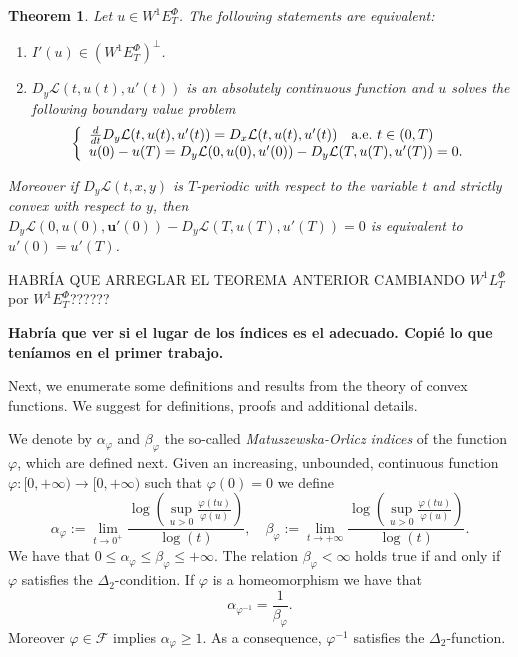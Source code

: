 \documentclass[twoside]{article}
\newtheorem{thm}{Theorem}[section]
\theoremstyle{remark}
\newcommand{\lphi}{L^{\Phi}}
\newcommand{\ephi}{E^{\Phi}}
\newcommand{\wphi}{W^{1}\lphi}
\newcommand{\wphiet}{W^{1}\ephi_T}
\renewcommand{\b}[1]{\boldsymbol{#1}}
\renewcommand{\leq}{\leqslant}
\renewcommand{\geq}{\geqslant}
\begin{document}
\begin{thm}\label{critpoint} Let $u\in\wphiet$. The following statements are equivalent:
\begin{enumerate}
 \item $I'(u)\in\left( \wphiet\right)^{\perp}$.
 \item  $D_{y}\mathcal{L}(t,u(t),u'(t))$ is an absolutely continuous function and $u$ solves the following boundary value problem
 \begin{equation}\label{ecualagran2}
    \left\{%
\begin{array}{ll}
   \frac{d}{dt} D_{y}\mathcal{L}(t,u(t),u'(t))= D_{x}\mathcal{L}(t,u(t),u'(t)) \quad \hbox{a.e.}\ t \in (0,T)\\
    u(0)-u(T)=D_{y}\mathcal{L}(0,u(0),u'(0))-D_{y}\mathcal{L}(T,u(T),u'(T))=0.
\end{array}%
\right.
\end{equation}
\end{enumerate}
Moreover if $D_{y}\mathcal{L}(t,x,y)$ is $T$-periodic with respect to the variable $t$ and strictly convex with respect to $y$, then
$D_{y}\mathcal{L}(0,u(0),\b{u'}(0))-D_{y}\mathcal{L}(T,u(T),u'(T))=0$ is equivalent to $u'(0)=u'(T)$.
\end{thm}

HABR\'IA QUE ARREGLAR EL TEOREMA ANTERIOR CAMBIANDO $\wphi_T$ por $\wphiet$??????

{\bf Habr\'ia que ver si el lugar de los \'indices es el adecuado. Copi\'e lo que ten\'iamos en el 
primer trabajo.}


Next, we enumerate some definitions and results from the theory of convex functions. 
We suggest \cite{FK97, GP77, KR, M, rao1991theory} for definitions, proofs and additional details.

We denote by $\alpha_{\varphi}$ and $\beta_{\varphi}$ the so-called  \emph{Matuszewska-Orlicz indices} of the function $\varphi$, which are defined next. Given
an increasing, unbounded, continuous function  \linebreak $\varphi:[ 0,+\infty)\to [0,+\infty)$ such that $\varphi(0)=0$ we define
\begin{equation}\label{MO_indices}
    \alpha_{\varphi}:=\lim\limits_{t\to 0^{+}}\frac{\log \left (\sup\limits_{u>0}\frac{\varphi(t u)}{\varphi(u)} \right ) }{\log(t)},\quad
    \beta_{\varphi}:=\lim\limits_{t\to +\infty}\frac{\log \left  (\sup\limits_{u>0}\frac{\varphi(t u)}{\varphi(u)}\right )}{\log(t)}.
\end{equation}
We have that $0\leq \alpha_{\varphi}\leq \beta_{\varphi}\leq +\infty$. The relation $\beta_{\varphi}<\infty$ holds true if and only if $\varphi$ satisfies the $\Delta_2$-condition. If $\varphi$ is a homeomorphism  we have that
\begin{equation}\label{inv_indices}
    \alpha_{\varphi^{-1}}=\frac{1}{\beta_{\varphi}}.
\end{equation}
Moreover $\varphi\in\mathcal{F}$ implies  $\alpha_{\varphi}\geq 1$. As a consequence, $\varphi^{-1}$ satisfies the $\Delta_2$-function.
\end{document}

